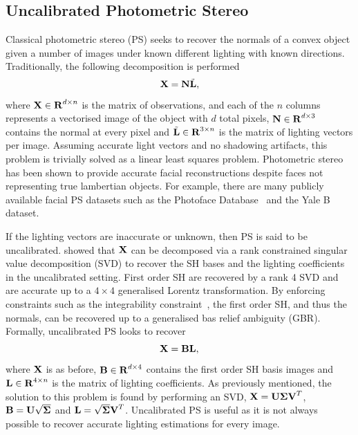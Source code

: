 \subsection{Uncalibrated Photometric Stereo}\label{subsec:imag_coll_uncalibrated_ps}
Classical photometric stereo (PS) seeks to recover the normals of a convex
object given a number of images under known different lighting with known
directions. Traditionally, the following decomposition is performed
\begin{equation}\label{eq:general_ps}
    \boldsymbol{\mathbf{X}} = \boldsymbol{\mathbf{N}} \tilde{\boldsymbol{\mathbf{L}}},
\end{equation}
where $\boldsymbol{\mathbf{X}} \in \boldsymbol{\mathbf{R}}^{d \times n}$ is the matrix of observations,
and each of the $n$ columns represents a vectorised image of the object with $d$
total pixels, $\boldsymbol{\mathbf{N}} \in \boldsymbol{\mathbf{R}}^{d \times 3}$ contains the normal at
every pixel and $\tilde{\boldsymbol{\mathbf{L}}} \in \boldsymbol{\mathbf{R}}^{3 \times n}$ is the matrix
of lighting vectors per image. Assuming accurate light vectors and no shadowing
artifacts, this problem is trivially solved as a linear least squares problem.
Photometric stereo has been shown to provide accurate facial reconstructions
despite faces not representing true lambertian objects. For example, there are
many publicly available facial PS datasets such as the 
Photoface Database~\cite{zafeiriou2013photoface} and the 
Yale B~\cite{georghiades2001fromfew} dataset.

If the lighting vectors are inaccurate or unknown, then PS is said to be
uncalibrated. \citet{basri2007photometric} showed that $\boldsymbol{\mathbf{X}}$ can
be decomposed via a rank constrained singular value decomposition (SVD) to
recover the SH bases and the lighting coefficients in the uncalibrated setting.
First order SH are recovered by a rank 4 SVD and are accurate up to a $4 \times 4$ 
generalised Lorentz transformation. By enforcing constraints such as the
integrability constraint~\cite{frankot1988method}, the first order SH, and thus the
normals, can be recovered up to a generalised bas relief ambiguity (GBR).
Formally, uncalibrated PS looks to recover
\begin{equation}\label{eq:uncalibrated_ps}
    \boldsymbol{\mathbf{X}} = \boldsymbol{\mathbf{B}} \boldsymbol{\mathbf{L}},
\end{equation}
where $\boldsymbol{\mathbf{X}}$ is as before, $\boldsymbol{\mathbf{B}} \in \boldsymbol{\mathbf{R}}^{d \times 4}$ 
contains the first order SH basis images and
$\boldsymbol{\mathbf{L}} \in \boldsymbol{\mathbf{R}}^{4 \times n}$ is the matrix of lighting coefficients. 
As previously mentioned, the solution to this problem is found by performing an
SVD,
$\boldsymbol{\mathbf{X}} =\nobreak \boldsymbol{\mathbf{U}} \boldsymbol{\mathbf{\Sigma}} \boldsymbol{\mathbf{V}}^T$, $\boldsymbol{\mathbf{B}} = \boldsymbol{\mathbf{U}} \sqrt{\boldsymbol{\mathbf{\Sigma}}}$
and $\boldsymbol{\mathbf{L}} = \sqrt{\boldsymbol{\mathbf{\Sigma}}} \boldsymbol{\mathbf{V}}^T$. 
Uncalibrated PS is useful as it is not always possible to recover accurate 
lighting estimations for every image.
